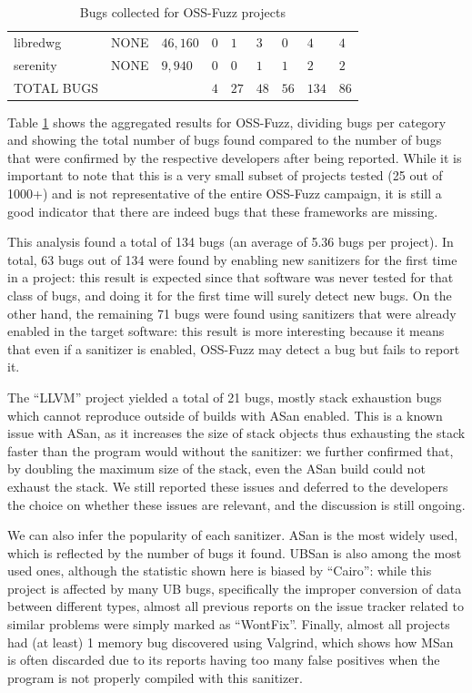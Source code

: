 \begin{table}[h!]
{\begin{tabular}{|l|l|l|l|l|l|l|l|l|}
libredwg         & NONE                & $46,160$            & $0$              & $1$           & $3$           & $0$            & $4$             & $4$                 \\
serenity         & NONE                & $9,940$             & $0$              & $0$           & $1$           & $1$            & $2$             & $2$                 \\
\hline
TOTAL BUGS   &   &   &$4$   &$27$   &$48$   &$56$   &$134$   &$86$       \\
\hline
\end{tabular}}
\vspace{10pt}
\caption{Bugs collected for OSS-Fuzz projects}
\label{ossfuzz-table}
\end{table}
Table \ref{ossfuzz-table} shows the aggregated results for OSS-Fuzz, dividing bugs per category and showing the total number of bugs found compared to the number of bugs that were confirmed by the respective developers after being reported. While it is important to note that this is a very small subset of projects tested (25 out of 1000+) and is not representative of the entire OSS-Fuzz campaign, it is still a good indicator that there are indeed bugs that these frameworks are missing.

This analysis found a total of 134 bugs (an average of 5.36 bugs per project). In total, 63 bugs out of 134 were found by enabling new sanitizers for the first time in a project: this result is expected since that software was never tested for that class of bugs, and doing it for the first time will surely detect new bugs. On the other hand, the remaining 71 bugs were found using sanitizers that were already enabled in the target software: this result is more interesting because it means that even if a sanitizer is enabled, OSS-Fuzz may detect a bug but fails to report it.

The ``LLVM'' project yielded a total of 21 bugs, mostly stack exhaustion bugs which cannot reproduce outside of builds with ASan enabled. This is a known issue with ASan, as it increases the size of stack objects thus exhausting the stack faster than the program would without the sanitizer: we further confirmed that, by doubling the maximum size of the stack, even the ASan build could not exhaust the stack. We still reported these issues and deferred to the developers the choice on whether these issues are relevant, and the discussion is still ongoing.

We can also infer the popularity of each sanitizer. ASan is the most widely used, which is reflected by the number of bugs it found. UBSan is also among the most used ones, although the statistic shown here is biased by ``Cairo'': while this project is affected by many UB bugs, specifically the improper conversion of data between different types, almost all previous reports on the issue tracker related to similar problems were simply marked as ``WontFix''. Finally, almost all projects had (at least) 1 memory bug discovered using Valgrind, which shows how MSan is often discarded due to its reports having too many false positives when the program is not properly compiled with this sanitizer. 



